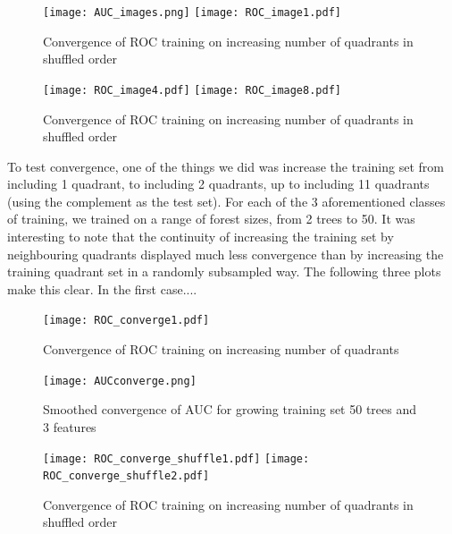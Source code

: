 \documentclass{article}\usepackage[]{graphicx}\usepackage[]{color}
\begin{document}
  \begin{figure}[H]
\centering
  \texttt{[image: AUC\_images.png]}
\endminipage\hfill
{}
  \texttt{[image: ROC\_image1.pdf]}
\endminipage\hfill
  \caption{Convergence of ROC training on increasing number of quadrants in shuffled order}\label{}
\end{figure}

  \begin{figure}[H]
  \texttt{[image: ROC\_image4.pdf]}
\endminipage\hfill
{}
  \texttt{[image: ROC\_image8.pdf]}
\endminipage\hfill
  \caption{Convergence of ROC training on increasing number of quadrants in shuffled order}\label{}
\end{figure}


 To test convergence, one of the things we did was increase the training set from including 1 quadrant, to including 2 quadrants, up to including 11 quadrants (using the complement as the test set).  For each of the 3 aforementioned classes of training, we trained on a range of forest sizes, from 2 trees to 50. It was interesting to note that the continuity of increasing the training set by neighbouring quadrants displayed much less convergence than by increasing the training quadrant set in a randomly subsampled way.  The following three plots make this clear.  In the first case....\\

\begin{figure}[H]
  \texttt{[image: ROC\_converge1.pdf]}
    \caption{Convergence of ROC training on increasing number of quadrants}\label{}
\endminipage
{}

\texttt{[image: AUCconverge.png]}
  \caption{Smoothed convergence of AUC for growing training set 50 trees and 3 features}\label{}
\endminipage

  \end{figure}
  
  \begin{figure}[H]
  \texttt{[image: ROC\_converge\_shuffle1.pdf]}
\endminipage\hfill
{}
  \texttt{[image: ROC\_converge\_shuffle2.pdf]}
\endminipage\hfill
  \caption{Convergence of ROC training on increasing number of quadrants in shuffled order}\label{}
\end{figure}
  
\end{document}
